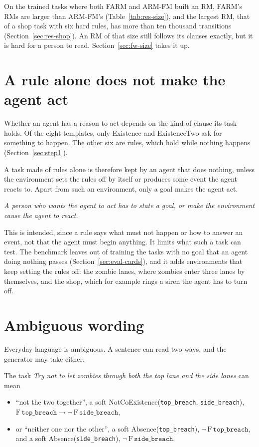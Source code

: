 \documentclass[11pt,english,listoffigures,listoftables]{tfgetsinf}
\newcommand{\keyidea}[1]{\par\smallskip\noindent\hspace*{0.6em}{\color{gray!55}\vrule width 1.5pt}\hspace{8pt}\parbox[t]{\dimexpr\linewidth-0.6em-9.5pt\relax}{\itshape #1}\par\smallskip}  %
\begin{document}
On the trained tasks where both FARM and ARM-FM built an RM, FARM's RMs are larger than ARM-FM's (Table~\ref{tab:res-size}), and the largest RM, that of a shop task with six hard rules, has more than ten thousand transitions (Section~\ref{sec:res-shop}). An RM of that size still follows its clauses exactly, but it is hard for a person to read. Section~\ref{sec:fw-size} takes it up.

\section{A rule alone does not make the agent act}
\label{sec:lim-rules}
Whether an agent has a reason to act depends on the kind of clause its task holds. Of the eight templates, only Existence and ExistenceTwo ask for something to happen. The other six are rules, which hold while nothing happens (Section~\ref{sec:step1}).

A task made of rules alone is therefore kept by an agent that does nothing, unless the environment sets the rules off by itself or produces some event the agent reacts to. Apart from such an environment, only a goal makes the agent act.

\keyidea{A person who wants the agent to act has to state a goal, or make the environment cause the agent to react.}

This is intended, since a rule says what must not happen or how to answer an event, not that the agent must begin anything. It limits what such a task can test. The benchmark leaves out of training the tasks with no goal that an agent doing nothing passes (Section~\ref{sec:eval-cards}), and it adds environments that keep setting the rules off: the zombie lanes, where zombies enter three lanes by themselves, and the shop, which for example rings a siren the agent has to turn off.


\section{Ambiguous wording}
\label{sec:lim-ambiguous}
Everyday language is ambiguous. A sentence can read two ways, and the generator may take either.

The task \textit{Try not to let zombies through both the top lane and the side lanes} can mean 
\begin{itemize}
    \item ``not the two together'', a soft NotCoExistence(\texttt{top\_\allowbreak breach}, \texttt{side\_\allowbreak breach}), $\mathrm{F}\,\texttt{top\_breach} \rightarrow \neg\,\mathrm{F}\,\texttt{side\_breach}$, 
    \item or ``neither one nor the other'', a soft Absence(\texttt{top\_\allowbreak breach}), $\neg\,\mathrm{F}\,\texttt{top\_breach}$, and a soft Absence(\texttt{side\_\allowbreak breach}), $\neg\,\mathrm{F}\,\texttt{side\_breach}$. 
\end{itemize}
\end{document}
